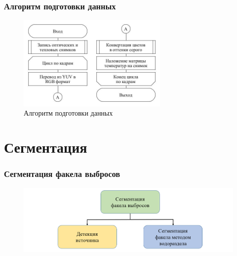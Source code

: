 \documentclass[t]{beamer}
\begin{document}
	\begin{frame}
		\frametitle{Алгоритм подготовки данных}
		\vspace*{0.35cm}
		\begin{figure}[h!]
			\centering
			\includegraphics[width = 0.65\textwidth]{image/chapter_2/fullprepare}	
			\caption{Алгоритм подготовки данных}
			\label{fig:fullprepare}
		\end{figure}
		
	\end{frame}

\section{Сегментация}

	\begin{frame}
		\frametitle{Сегментация факела выбросов}
		\vspace*{0.9cm}
		\begin{figure}[h!]
			\centering
			\includegraphics[width = \textwidth]{image/scheme3}	
		\end{figure}
	\end{frame}
\end{document}
